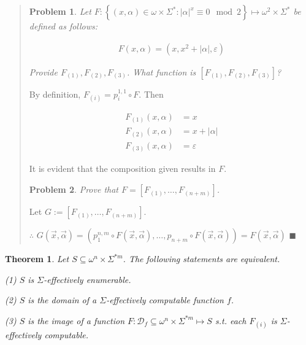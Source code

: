 \documentclass[a4paper, 12pt]{article}
\newtheorem{problem}{Problem}
\newtheorem{theorem}{Theorem}
\newtheorem{problem}{Problem}
\newtheorem{theorem}{Theorem}
\begin{document}
\small
\begin{quote}

\begin{problem}
    Let $F : \left\{ (x, \alpha) \in  \omega \times \Sigma^{*} : |\alpha|^x
        \equiv 0 \mod 2
    \right\} \mapsto \omega^2 \times \Sigma^{*}$ be defined as follows: 

    \begin{align*}
        F(x, \alpha) = (x, x^2 + |\alpha|, \varepsilon)
    \end{align*}

    Provide $F_{(1)}, F_{(2)}, F_{(3)}$. What function is $[F_{(1)}, F_{(2)},
    F_{(3)}]$?
\end{problem}

By definition, $F_{(i)} = p_i^{1, 1} \circ F$. Then 

\begin{align*}
    F_{(1)}(x, \alpha) &= x \\
    F_{(2)}(x, \alpha) &= x + |\alpha| \\
    F_{(3)}(x, \alpha) &= \varepsilon
\end{align*}

It is evident that the composition given results in $F$.

\begin{problem}
    Prove that $F = \left[ F_{(1)}, \ldots, F_{(n + m)} \right] $.
\end{problem}

Let $G := \left[ F_{(1)}, \ldots, F_{(n+m)} \right] $. 

$\therefore $  $G(\vec{x}, \vec{\alpha}) = \left( p_1^{n, m} \circ F(\vec{x},
\vec{\alpha}), \ldots, p_{n+m} \circ F(\vec{x}, \vec{\alpha})   \right)  =
F(\vec{x}, \vec{\alpha}) $ $\blacksquare$



\end{quote}
\normalsize

\begin{theorem}
    Let $S \subseteq \omega^{n} \times \Sigma^{*m} $. The following statements are equivalent. 

    \textit{(1)} $S$ is $\Sigma$-effectively enumerable. 

    \textit{(2)} $S$ is the domain of a $\Sigma$-effectively computable function
    $f$.  

    \textit{(3)} $S$ is the image of a function $F: \mathcal{D}_f \subseteq
    \omega^{n} \times \Sigma^{*m} \mapsto S$ s.t. each $F_{(i)}$ is
    $\Sigma$-effectively computable.
\end{theorem}
\end{document}
